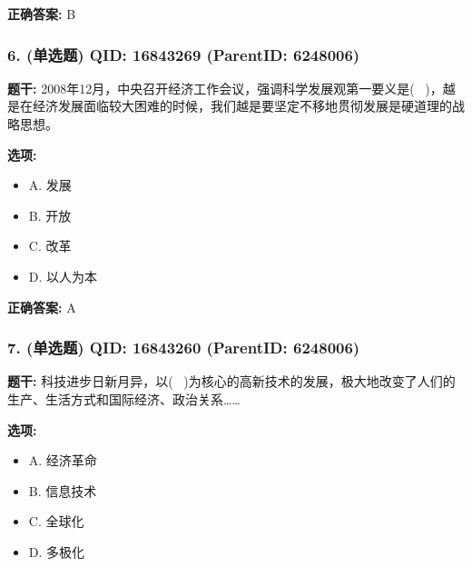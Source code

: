 \documentclass[12pt,UTF8]{ctexart}
\begin{document}
\textbf{正确答案:}
B

\vspace{0.3em}\hrulefill\vspace{0.7em}

\subsubsection*{6. (单选题) \small QID: 16843269 (ParentID: 6248006)}

\textbf{题干:}
2008年12月，中央召开经济工作会议，强调科学发展观第一要义是(  )，越是在经济发展面临较大困难的时候，我们越是要坚定不移地贯彻发展是硬道理的战略思想。



\textbf{选项:}
\begin{itemize}[leftmargin=*]

  \item A. 发展

  \item B. 开放

  \item C. 改革

  \item D. 以人为本

\end{itemize}

\textbf{正确答案:}
A

\vspace{0.3em}\hrulefill\vspace{0.7em}

\subsubsection*{7. (单选题) \small QID: 16843260 (ParentID: 6248006)}

\textbf{题干:}
科技进步日新月异，以(  )为核心的高新技术的发展，极大地改变了人们的生产、生活方式和国际经济、政治关系……



\textbf{选项:}
\begin{itemize}[leftmargin=*]

  \item A. 经济革命

  \item B. 信息技术

  \item C. 全球化

  \item D. 多极化

\end{itemize}
\end{document}
